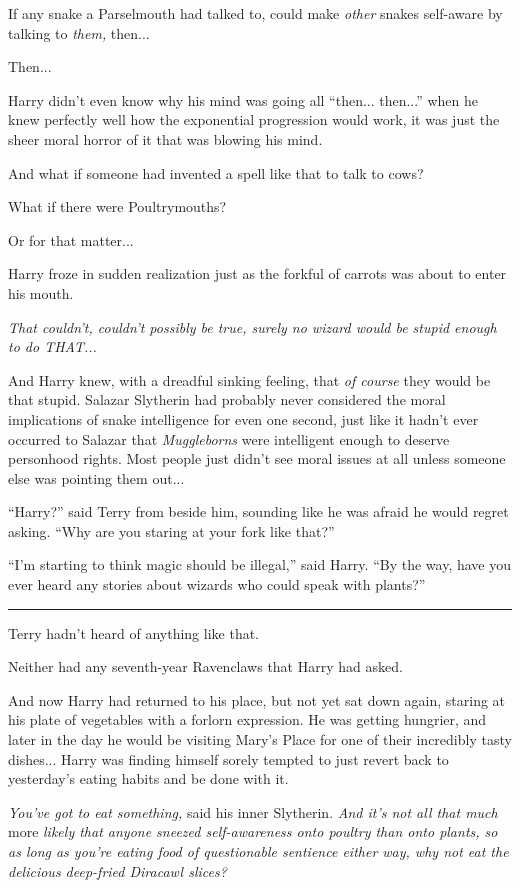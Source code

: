 If any snake a Parselmouth had talked to, could make \emph{other} snakes
self-aware by talking to \emph{them,} then...

Then...

Harry didn't even know why his mind was going all ``then...
then...'' when he knew perfectly well how the exponential
progression would work, it was just the sheer moral horror of it that
was blowing his mind.

And what if someone had invented a spell like that to talk to cows?

What if there were Poultrymouths?

Or for that matter...

Harry froze in sudden realization just as the forkful of carrots was
about to enter his mouth.

\emph{That couldn't, couldn't possibly be true, surely no wizard would
be stupid enough to do THAT...}

And Harry knew, with a dreadful sinking feeling, that \emph{of course}
they would be that stupid. Salazar Slytherin had probably never
considered the moral implications of snake intelligence for even one
second, just like it hadn't ever occurred to Salazar that
\emph{Muggleborns} were intelligent enough to deserve personhood rights.
Most people just didn't see moral issues at all unless someone else was
pointing them out...

``Harry?'' said Terry from beside him, sounding like he was afraid he
would regret asking. ``Why are you staring at your fork like that?''

``I'm starting to think magic should be illegal,'' said Harry. ``By the
way, have you ever heard any stories about wizards who could speak with
plants?''

\begin{center}\rule{3in}{0.4pt}\end{center}

Terry hadn't heard of anything like that.

Neither had any seventh-year Ravenclaws that Harry had asked.

And now Harry had returned to his place, but not yet sat down again,
staring at his plate of vegetables with a forlorn expression. He was
getting hungrier, and later in the day he would be visiting Mary's Place
for one of their incredibly tasty dishes... Harry was finding
himself sorely tempted to just revert back to yesterday's eating habits
and be done with it.

\emph{You've got to eat something,} said his inner Slytherin. \emph{And
it's not all that much} more \emph{likely that anyone sneezed
self-awareness onto poultry than onto plants, so as long as you're
eating food of questionable sentience either way, why not eat the
delicious deep-fried Diracawl slices?}


